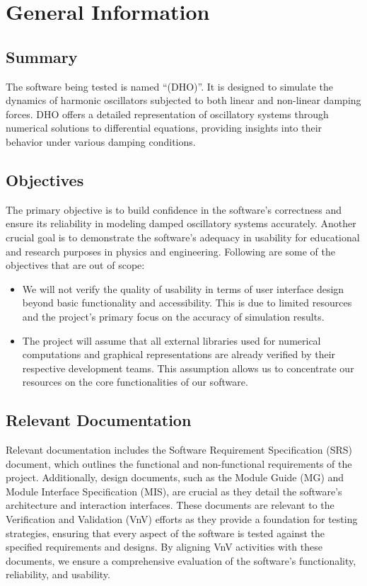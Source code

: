\documentclass[12pt, titlepage]{article}
\begin{document}
\section{General Information}

\subsection{Summary}

The software being tested is named ``\progname(DHO)''. It is designed to simulate the 
dynamics of harmonic oscillators subjected to both linear and non-linear damping forces. 
DHO offers a detailed representation of oscillatory systems through  numerical solutions 
to differential equations, providing insights into their behavior under various damping 
conditions.

\subsection{Objectives}

The primary objective is to build confidence in the software's correctness and ensure its 
reliability in modeling damped oscillatory systems accurately. Another crucial goal is 
to demonstrate the software's adequacy in usability for educational and research purposes 
in physics and engineering. 
Following are some of the objectives that are out of scope:

\begin{itemize}
  \item We will not verify the quality of usability in terms of user interface design 
  beyond basic functionality and accessibility. This is due to limited resources and the 
  project's primary focus on the accuracy of simulation results.
  \item The project will assume that all external libraries used for numerical 
  computations and graphical representations are already verified by their respective 
  development teams. This assumption allows us to concentrate our resources on the core 
  functionalities of our software.
\end{itemize}

\subsection{Relevant Documentation}

Relevant documentation includes the Software Requirement Specification (SRS) document, 
which outlines the functional and non-functional requirements of the project. 
Additionally, design documents, such as the Module Guide (MG) and Module Interface 
Specification (MIS), are crucial as they detail the software's architecture and 
interaction interfaces. These documents are relevant to the Verification and Validation 
(VnV) efforts as they provide a foundation for testing strategies, ensuring that every 
aspect of the software is tested against the specified requirements and designs. By 
aligning VnV activities with these documents, we ensure a comprehensive evaluation of 
the software's functionality, reliability, and usability.
\end{document}
